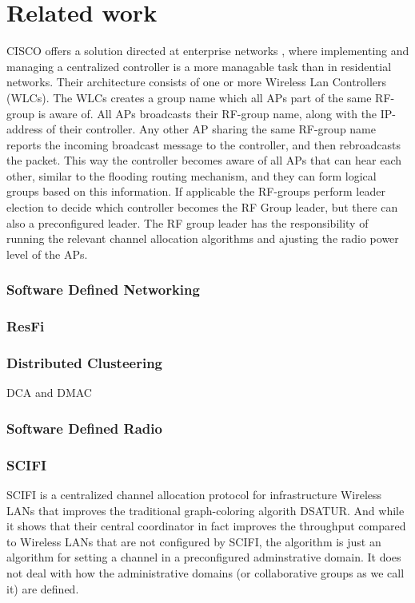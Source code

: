 \chapter{Related work}
CISCO offers a solution directed at enterprise networks \cite{ciscoRRM}, where implementing and managing a centralized
controller is a more managable task than in residential networks.
Their architecture consists of one or more Wireless Lan Controllers (WLCs).
The WLCs creates a group name which all APs part of the same RF-group is aware of. All APs broadcasts their RF-group name, along
with the IP-address of their controller. Any other AP sharing the same RF-group name reports the incoming broadcast message to the controller, and then rebroadcasts the packet.  This way the controller
becomes aware of all APs that can hear each other, similar to the flooding routing mechanism,
and they can form logical groups based on this information.
If applicable the RF-groups perform leader election to decide which controller becomes the RF Group leader, but there
can also a preconfigured leader. The RF group leader has the responsibility of running the relevant channel allocation
algorithms and ajusting the radio power level of the APs. 

\subsection{Software Defined Networking}

\subsection{ResFi}
\subsection{Distributed Clusteering}
DCA and DMAC

\subsection{Software Defined Radio}
\subsection{SCIFI} SCIFI \cite{SCIFI} is a centralized channel allocation protocol for infrastructure Wireless LANs that improves the traditional graph-coloring algorith DSATUR. 
		And while it shows that their central coordinator in fact improves the throughput compared to Wireless LANs that are not configured by SCIFI, the algorithm is just an algorithm for setting 
		a channel in a preconfigured adminstrative domain. It does not deal with how the administrative domains (or collaborative groups as we call it) are defined. 


